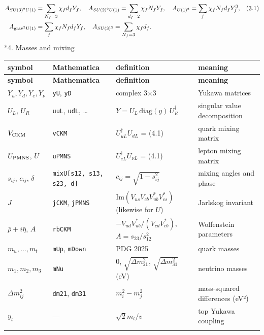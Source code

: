 \documentclass[10pt,a4paper]{article}
\makeatletter
\renewcommand\section{\@startsection{section}{1}{\z@}{-3.5ex \@plus -1ex \@minus -.2ex}{2.3ex \@plus.2ex}{\normalfont\Large\bfseries\raggedright}}
\makeatother
\begin{document}
\begin{align*}
A_{SU(3)^2U(1)}&=\sum_{N_f=3}\chi_fd_fY_f,\quad A_{SU(2)^2U(1)}=\sum_{d_f=2}\chi_fN_fY_f,\quad A_{U(1)^3}=\sum_f\chi_fN_fd_fY_f^3,&&(3.1) \\
A_{\rm grav^2U(1)}&=\sum_f\chi_fN_fd_fY_f,\quad A_{SU(3)^3}=\sum_{N_f=3}\chi_fd_f .
\end{align*}
\section*{4. Masses and mixing}
{\small
\begin{longtable}{>{\raggedright\arraybackslash}p{}>{\raggedright\arraybackslash}p{}>{\raggedright\arraybackslash}p{}>{\raggedright\arraybackslash}p{}}
\toprule
\textbf{symbol} & \textbf{Mathematica} & \textbf{definition} & \textbf{meaning} \\
\midrule\endfirsthead
\toprule
\textbf{symbol} & \textbf{Mathematica} & \textbf{definition} & \textbf{meaning} \\
\midrule\endhead
\endfoot
\bottomrule\endlastfoot
$Y_u,Y_d,Y_e,Y_\nu$ & \texttt{yU}, \texttt{yD} & complex 3×3 & Yukawa matrices \\
$U_L$, $U_R$ & \texttt{uuL}, \texttt{udL}, … & $Y=U_L\,\mathrm{diag}(y)\,U_R^\dagger$ & singular value decomposition \\
$V_{\rm CKM}$ & \texttt{vCKM} & $U_{uL}^\dagger U_{dL}$ = (4.1) & quark mixing matrix \\
$U_{\rm PMNS}$, $U$ & \texttt{uPMNS} & $U_{eL}^\dagger U_{\nu L}$ = (4.1) & lepton mixing matrix \\
$s_{ij}$, $c_{ij}$, $\delta$ & \texttt{mixU[s12, s13, s23, d]} & $c_{ij}=\sqrt{1-s_{ij}^2}$ & mixing angles and phase \\
$J$ & \texttt{jCKM}, \texttt{jPMNS} & $\mathrm{Im}(V_{us}V_{cb}V_{ub}^*V_{cs}^*)$ (likewise for $U$) & Jarlskog invariant \\
$\bar\rho+i\bar\eta$, $A$ & \texttt{rbCKM} & $-V_{ud}V_{ub}^*/(V_{cd}V_{cb}^*)$, $A=s_{23}/s_{12}^2$ & Wolfenstein parameters \\
$m_u,\dots,m_t$ & \texttt{mUp}, \texttt{mDown} & PDG 2025 & quark masses \\
$m_1,m_2,m_3$ & \texttt{mNu} & $0$, $\sqrt{\Delta m^2_{21}}$, $\sqrt{\Delta m^2_{31}}$ (eV) & neutrino masses \\
$\Delta m^2_{ij}$ & \texttt{dm21}, \texttt{dm31} & $m_i^2-m_j^2$ & mass-squared differences (eV²) \\
$y_t$ & — & $\sqrt2m_t/v$ & top Yukawa coupling \\*
\end{longtable}}
\end{document}
